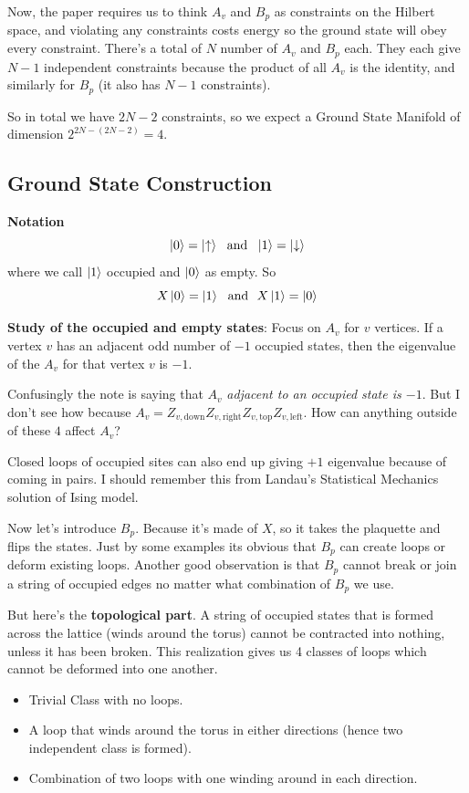 \documentclass[12pt]{article}        %
\begin{document}
Now, the paper requires us to think $A_v$ and $B_p$ as constraints on the Hilbert space, and violating any constraints costs energy so the ground state will obey every constraint. There's a total of $N$ number of $A_v$ and $B_p$ each. They each give $N-1$ independent constraints because the product of all $A_v$ is the identity, and similarly for $B_p$ (it also has $N-1$ constraints). 

So in total we have $2N - 2$ constraints, so we expect a Ground State Manifold of dimension $2 ^{2N - (2N - 2)} = 4$.
%
%
%
\subsection*{Ground State Construction}
\textbf{Notation}
\[\ket{0} = \ket{\uparrow} \ \ \text{and} \ \ 
\ket{1} = \ket{\downarrow}
\]
where we call $\ket{1}$ occupied and $\ket{0} $ as empty. 
So 
\[
X \ket{0} = \ket{1} \ \ \text{and} \ \ 
X \ket{1} = \ket{0}
\] 

\textbf{Study of the occupied and empty states}: Focus on $A_v$ for $v$ vertices. If a vertex $v$ has an adjacent odd number of $-1$ occupied states, then the eigenvalue of the $A_v$ for that vertex $v$ is $-1$. 

Confusingly the note is saying that $A_v$ \emph{adjacent to an occupied state is $-1$}. But I don't see how because $A_v = Z_{v, \text{down}} Z_{v, \text{right}} Z_{v, \text{top}} Z_{v, \text{left}}$. How can anything outside of these $4$ affect $A_v$?

Closed loops of occupied sites can also end up giving $+1$ eigenvalue because of coming in pairs. I should remember this from Landau's Statistical Mechanics solution of Ising model. 


Now let's introduce $B_p$. Because it's made of $X$, so it takes the plaquette and flips the states. Just by some examples its obvious that $B_p$ can create loops or deform existing loops. Another good observation is that $B_p$ cannot break or join a string of occupied edges no matter what combination of $B_p$ we use.

But here's the \textbf{topological part}. A string of occupied states that is formed across the lattice (winds around the torus) cannot be contracted into nothing, unless it has been broken. This realization gives us 4 classes of loops which cannot be deformed into one another. 
\begin{itemize}
	\item Trivial Class with no loops.
	\item A loop that winds around the torus in either directions (hence two independent class is formed).
	\item Combination of two loops with one winding around in each direction.
\end{itemize}
\end{document}

